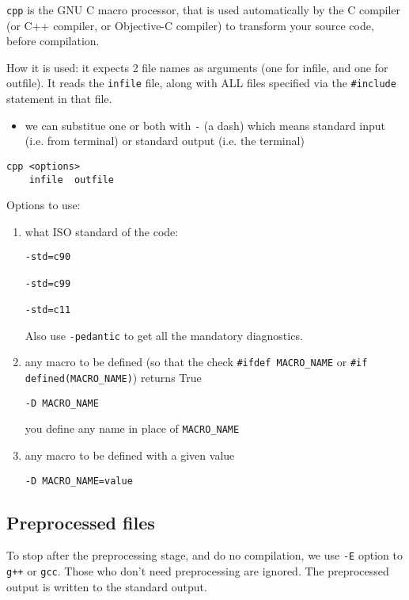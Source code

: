 \verb!cpp! is the GNU C macro processor, that is used automatically by the C
compiler (or C++ compiler, or Objective-C compiler) to transform your source
code, before compilation.

How it is used: it expects 2 file names as arguments (one for infile, and one
for outfile).
It reads the \verb!infile! file, along with ALL files specified via the
\verb!#include! statement in that file. 
\begin{itemize}
  \item we can substitue one or both with \verb!-! (a dash) which means standard input (i.e. from terminal) or standard output (i.e. the terminal)
\end{itemize}

\begin{verbatim}
cpp <options>
    infile  outfile
\end{verbatim}
Options to use:

\begin{enumerate}
  \item what ISO standard of the code:
  
\begin{verbatim}
-std=c90

-std=c99

-std=c11
\end{verbatim}
  
Also use \verb!-pedantic! to get all the mandatory diagnostics.  
  
  \item any macro to be defined (so that the check \verb!#ifdef MACRO_NAME! or 
  \verb!#if defined(MACRO_NAME)!) returns True
  
\begin{verbatim}
-D MACRO_NAME
\end{verbatim}
you define any name in place of \verb!MACRO_NAME!

  \item any macro to be defined with a given value
\begin{verbatim}
-D MACRO_NAME=value
\end{verbatim}  
  
  
\end{enumerate}


\subsection{Preprocessed files}
\label{sec:preprocessed-file}

To stop after the preprocessing stage, and do no compilation, we use \verb!-E!
option to \verb!g++! or \verb!gcc!. Those who don't need preprocessing are
ignored. The preprocessed output is written to the standard output. 


